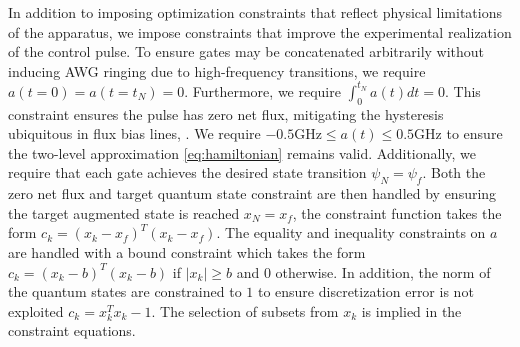 In addition to imposing optimization constraints that
reflect physical limitations of the apparatus, we impose
constraints that improve the experimental realization of the control pulse.
To ensure gates may be concatenated arbitrarily without
inducing AWG ringing due to high-frequency transitions,
we require $a(t = 0) = a(t = t_{N}) = 0$.
Furthermore, we require $\int_{0}^{t_{N}} a(t) dt = 0$. This
constraint ensures the pulse has zero net flux, mitigating
the hysteresis ubiquitous in flux bias lines,
\cite{battistel2019fast, krantz2019quantum, zhang2020universal}.
We require $-0.5 \textrm{GHz} \le a(t) \le 0.5 \textrm{GHz}$
to ensure the two-level approximation \eqref{eq:hamiltonian}
remains valid. Additionally, we require that each gate achieves
the desired state transition $\psi_{N} = \psi_{f}$.
Both the zero net flux and target quantum state constraint
are then handled by ensuring the target augmented state is
reached $x_{N} = x_{f}$, the constraint function
takes the form
$c_{k} = (x_{k} - x_{f})^{T}(x_{k} - x_{f})$.
The equality and inequality constraints on $a$ are handled
with a bound constraint which takes the form
$c_{k} = (x_{k} - b)^{T}(x_{k} - b)$ if $\lvert x_{k} \rvert \ge b$
and $0$ otherwise.
In addition, the norm of the quantum states
are constrained to $1$ to ensure discretization error is not
exploited $c_{k} = x_{k}^{T}x_{k} - 1$. The selection
of subsets from $x_{k}$ is implied in
the constraint equations.
